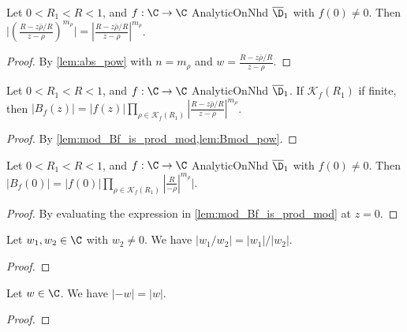 \begin{lemma}\label{lem:Bmod_pow}  \leanok
Let $0<R_1<R<1$, and $f:\C\to\C$ AnalyticOnNhd $\overline{\D}_1$ with $f(0)\neq0$. Then $\Big|\left(\frac{R-z\bar\rho/R}{z-\rho}\right)^{m_\rho}\Big|=\left|\frac{R-z\bar\rho/R}{z-\rho}\right|^{m_\rho}$.
\end{lemma}
\begin{proof} \leanok
{}
By \cref{lem:abs_pow} with $n=m_\rho$ and $w=\frac{R-z\bar\rho/R}{z-\rho}$.
\end{proof}


\begin{lemma}[B modulus]\label{lem:mod_Bf_prod_mod}  \leanok
Let $0<R_1<R<1$, and $f:\C\to\C$ AnalyticOnNhd $\overline{\D}_1$. If $\mathcal K_f(R_1)$ if finite, then $|B_f(z)|=|f(z)|\prod_{\rho\in\mathcal K_f(R_1)}\left|\frac{R-z\bar\rho/R}{z-\rho}\right|^{m_\rho}$.
\end{lemma}
\begin{proof} \leanok
{}
By \cref{lem:mod_Bf_is_prod_mod,lem:Bmod_pow}.
\end{proof}


\begin{lemma}[B at zero]\label{lem:mod_Bf_at_0}  \leanok
Let $0<R_1<R<1$, and $f:\C\to\C$ AnalyticOnNhd $\overline{\D}_1$ with $f(0)\neq0$. Then $|B_f(0)|=|f(0)|\prod_{\rho\in\mathcal K_f(R_1)}\left|\frac{R}{-\rho}\right|^{m_\rho}|$.
\end{lemma}
\begin{proof} \leanok
{}
By evaluating the expression in \cref{lem:mod_Bf_is_prod_mod} at $z=0$.
\end{proof}


\begin{lemma}\label{lem:mod_div_}  \leanok
Let $w_1, w_2 \in \C$ with $w_2 \neq 0$. We have $|w_1/w_2| = |w_1|/|w_2|$.
\end{lemma}
\begin{proof} \leanok
\end{proof}

\begin{lemma} \label{lem:mod_neg} \leanok
Let $w \in \C$. We have $|-w| = |w|$.
\end{lemma}
\begin{proof} \leanok
\end{proof}

